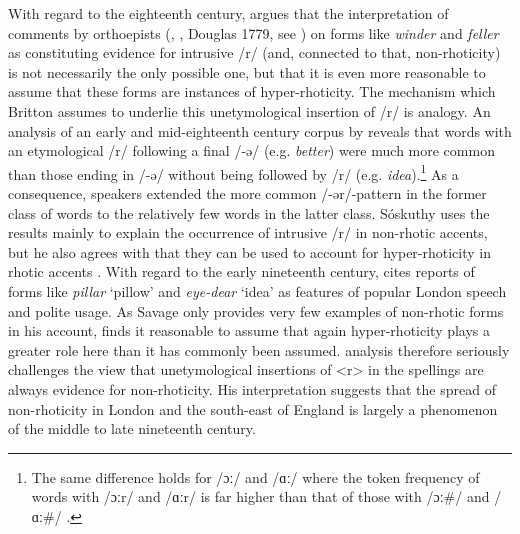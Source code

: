 With regard to the eighteenth century, \citet[530]{Britton2007} argues that the interpretation of comments by orthoepists (\citealt[37]{Walker1791}, \citealt[264]{Elphinston1786}, Douglas 1779, see \citealt{Jones1991}) on forms like \emph{winder} and \emph{feller} as constituting evidence for intrusive /r/ (and, connected to that, non-rhoticity) is not necessarily the only possible one, but that it is even more reasonable to assume that these forms are instances of hyper-rhoticity. The mechanism which Britton assumes to underlie this unetymological insertion of /r/ is analogy. An analysis of an early and mid-eighteenth century corpus by \citet{Soskuthy2013} reveals that words with an etymological /r/ following a final /-ə/ (e.g. \textit{better}) were much more common than those ending in /-ə/ without being followed by /r/ (e.g. \textit{idea}).\footnote{The same difference holds for /ɔː/ and /ɑː/ where the token frequency of words with /ɔːr/ and  /ɑːr/ is far higher than that of those with /ɔː\#/ and /ɑː\#/ \citep[60]{Soskuthy2013}.} As a consequence, speakers extended the more common /-ər/-pattern in the former class of words to the relatively few words in the latter class. Sóskuthy uses the results mainly to explain the occurrence of intrusive /r/ in non-rhotic accents, but he also agrees with \citet{Britton2007} that they can be used to account for hyper-rhoticity in rhotic accents \citep[77]{Soskuthy2013}. With regard to the early nineteenth century, \citet[529]{Britton2007} cites  reports of forms like \emph{pillar} ‘pillow’ and \emph{eye-dear} ‘idea’ as features of popular London speech and polite usage. As Savage only provides very few examples of non-rhotic forms in his account, \citet[529]{Britton2007} finds it reasonable to assume that again hyper-rhoticity plays a greater role here than it has commonly been assumed.  analysis therefore seriously challenges the view that unetymological insertions of <r> in the spellings are always evidence for non-rhoticity. His interpretation suggests that the spread of non-rhoticity in London and the south-east of England is largely a phenomenon of the middle to late nineteenth century.

